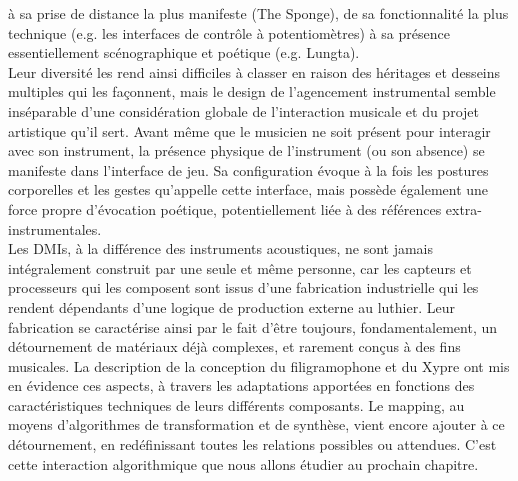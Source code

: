 à sa prise de distance la plus manifeste (The Sponge), de sa fonctionnalité la plus technique (e.g. les interfaces de contrôle à potentiomètres) à sa présence essentiellement scénographique et poétique (e.g. Lungta).\\
\indent Leur diversité les rend ainsi difficiles à classer en raison des héritages et desseins multiples qui les façonnent, mais le design de l'agencement instrumental semble inséparable d'une considération globale de l'interaction musicale et du projet artistique qu'il sert. Avant même que le musicien ne soit présent pour interagir avec son instrument, la présence physique de l'instrument (ou son absence) se manifeste dans l'interface de jeu. Sa configuration évoque à la fois les postures corporelles et les gestes qu'appelle cette interface, mais possède également une force propre d'évocation poétique, potentiellement liée à des références extra-instrumentales.\\
\indent Les \glspl{DMI}, à la différence des instruments acoustiques, ne sont jamais intégralement construit par une seule et même personne, car les capteurs et processeurs qui les composent sont issus d'une fabrication industrielle qui les rendent dépendants d'une logique de production externe au luthier. Leur fabrication se caractérise ainsi par le fait d'être toujours, fondamentalement, un détournement de matériaux déjà complexes, et rarement conçus à des fins musicales. La description de la conception du filigramophone et du Xypre ont mis en évidence ces aspects, à travers les adaptations apportées en fonctions des caractéristiques techniques de leurs différents composants. Le mapping, au moyens d'algorithmes de transformation et de synthèse, vient encore ajouter à ce détournement, en redéfinissant toutes les relations possibles ou attendues. C'est cette interaction algorithmique que nous allons étudier au prochain chapitre.






